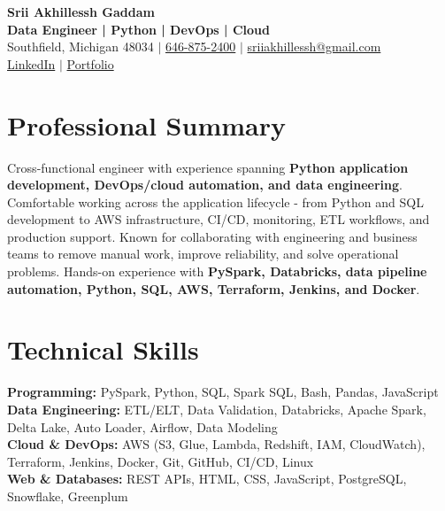 \documentclass[letterpaper,10pt]{article}
\begin{document}
\fontsize{9.35pt}{10.45pt}\selectfont

\begin{center}
    {\LARGE \textbf{Srii Akhillessh Gaddam}} \\[-1pt]
    \textbf{Data Engineer | Python | DevOps | Cloud} \\[2pt]
    Southfield, Michigan 48034 $|$
    \href{tel:6468752400}{646-875-2400} $|$
    \href{mailto:sriiakhillessh@gmail.com}{sriiakhillessh@gmail.com} \\[1pt]
    \href{https://www.linkedin.com/in/srii-akhiilessh-gaddam-b48668191/}{LinkedIn} $|$
    \href{https://sriiakhillesshg.github.io/portfolio/}{Portfolio}
\end{center}
\vspace{-8pt}

\section{Professional Summary}
\small{Cross-functional engineer with experience spanning \textbf{Python application development, DevOps/cloud automation, and data engineering}. Comfortable working across the application lifecycle - from Python and SQL development to AWS infrastructure, CI/CD, monitoring, ETL workflows, and production support. Known for collaborating with engineering and business teams to remove manual work, improve reliability, and solve operational problems. Hands-on experience with \textbf{PySpark, Databricks, data pipeline automation, Python, SQL, AWS, Terraform, Jenkins, and Docker}.}

\section{Technical Skills}
\small{
\textbf{Programming:} PySpark, Python, SQL, Spark SQL, Bash, Pandas, JavaScript \\
\textbf{Data Engineering:} ETL/ELT, Data Validation, Databricks, Apache Spark, Delta Lake, Auto Loader, Airflow, Data Modeling \\
\textbf{Cloud \& DevOps:} AWS (S3, Glue, Lambda, Redshift, IAM, CloudWatch), Terraform, Jenkins, Docker, Git, GitHub, CI/CD, Linux \\
\textbf{Web \& Databases:} REST APIs, HTML, CSS, JavaScript, PostgreSQL, Snowflake, Greenplum
}

\end{document}
